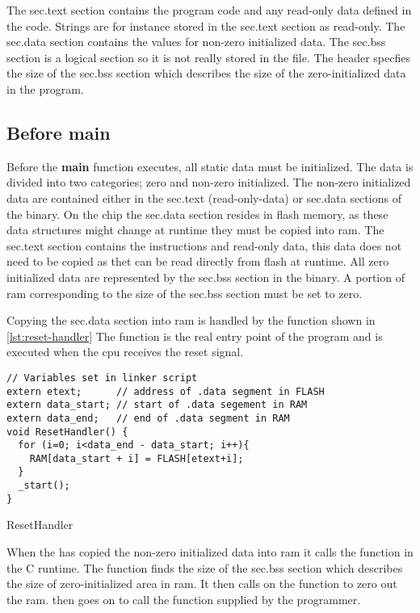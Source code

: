 The {\elf}sec{.text} section contains the program code and any read-only data defined in the code.
Strings are for instance stored in the {\elf}sec{.text} section as read-only.
The {\elf}sec{.data} section contains the values for non-zero initialized data.
The {\elf}sec{.bss} section is a logical section so it is not really stored in the file.
The header specfies the size of the {\elf}sec{.bss} section which describes the size of the zero-initialized data in the program.

\subsection{Before main}

Before the \textbf{main} function executes, all static data must be initialized.
The data is divided into two categories; zero and non-zero initialized.
The non-zero initialized data are contained either in the {\elf}sec{.text} (read-only-data) or {\elf}sec{.data} sections of the {\elf} binary.
On the chip the {\elf}sec{.data} section resides in flash memory, as these data structures might change at runtime they must be copied into \gls{ram}.
The {\elf}sec{.text} section contains the instructions and read-only data, this data does not need to be copied as thet can be read directly from flash at runtime.
All zero initialized data are represented by the {\elf}sec{.bss} section in the {\elf} binary.
A portion of \gls{ram} corresponding to the size of the {\elf}sec{.bss} section must be set to zero.

Copying the {\elf}sec{.data} section into \gls{ram} is handled by the  function shown in \autoref{lst:reset-handler}
The function is the real entry point of the program and is executed when the \gls{cpu} receives the reset signal.

\begin{listing}[H]
\begin{verbatim}
// Variables set in linker script
extern etext;      // address of .data segment in FLASH
extern data_start; // start of .data segement in RAM
extern data_end;   // end of .data segment in RAM
void ResetHandler() {
  for (i=0; i<data_end - data_start; i++){
    RAM[data_start + i] = FLASH[etext+i];
  }
  _start();
}
\end{verbatim}
\caption{ResetHandler}
\label{lst:reset-handler}
\end{listing}

When the  has copied the non-zero initialized data into \gls{ram} it calls the  function in the C runtime.
The  function finds the size of the {\elf}sec{.bss} section which describes the size of zero-initialized area in \gls{ram}.
It then calls on the  function to zero out the \gls{ram}.
 then goes on to call the {\main} function supplied by the programmer.

